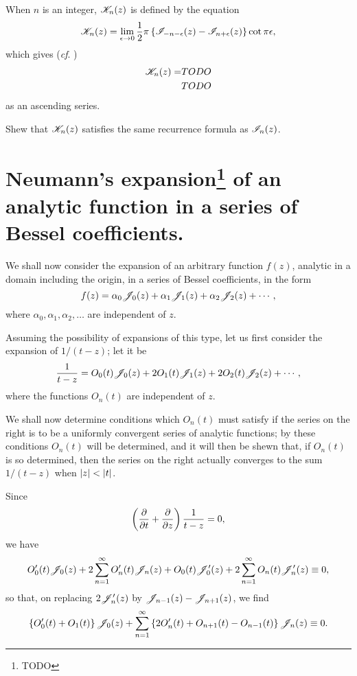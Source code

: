 \documentclass{book}
\begin{document}
When $n$ is an integer, $\mathscr{K}_n(z)$ is defined by the equation
$$
\mathscr{K}_n(z)
=
\lim_{\epsilon\rightarrow 0}
\frac{1}{2} \pi
\left\{  \mathscr{I}_{-n-\epsilon}(z) - \mathscr{I}_{n+\epsilon}(z) \right\} \cot \pi\epsilon,
$$
which gives (\emph{cf}. )
\begin{align*}
  \mathscr{K}_n(z)
  =&
  TODO
  \\
  &
  TODO
\end{align*}
as an ascending series.
\begin{wandwexample}
  Shew that $\mathscr{K}_n(z)$ satisfies the same recurrence formula as
  $\mathscr{I}_n(z)$. 
\end{wandwexample}

\section[Neumann's expansion of an analytic
function in a series of Bessel coefficients.]{Neumann's
  expansion\footnote{TODO} of an analytic function in a series
  of Bessel coefficients.}
We shall now consider the expansion of an arbitrary function
$f(z)$, analytic in a domain including the origin, in a series
of Bessel coefficients, in the form
$$
f(z) = \alpha_0 \mathscr{J}_0(z) + \alpha_1 \mathscr{J}_1(z) + \alpha_2
\mathscr{J}_2(z) + \cdots,
$$
where $\alpha_0, \alpha_1, \alpha_2,\ldots$ are independent of
$z$.

Assuming the possibility of expansions of this type, let us first
consider the expansion of $1/(t-z)$; let it be
$$
\frac{1}{t-z}
=
O_0(t) \mathscr{J}_0(z)
+ 2 O_1(t) \mathscr{J}_1(z)
+ 2 O_2(t) \mathscr{J}_2(z)
+ \cdots,
$$
where the functions $O_n(t)$ are independent of $z$.

We shall now determine conditions which $O_n(t)$ must satisfy if the
series on the right is to be a uniformly convergent series of analytic
functions; by these conditions $O_n(t)$ will be determined, and it
will then be shewn that, if $O_n(t)$ is so determined, then the series
on the right actually converges to the sum $1/(t-z)$ when
$\left| z \right| < \left| t \right|$.

Since
$$
\left( 
  \frac{\partial}{\partial t}
  +
  \frac{\partial}{\partial z}  
 \right)
\frac{1}{t-z}
=
0,
$$
we have
$$
O'_0(t) \mathscr{J}_0(z)
+
2 \sum_{n=1}^{\infty}
O'_n(t) \mathscr{J}_n(z)
+
O_0(t) \mathscr{J}'_0(z)
+
2 \sum_{n=1}^{\infty}
O_n(t) \mathscr{J}'_n(z)
\equiv
0,
$$
so that, on replacing $2\mathscr{J}'_n(z)$ by
$\mathscr{J}_{n-1}(z) - \mathscr{J}_{n+1}(z)$, we find
$$
\left\{  O'_0(t) + O_1(t)  \right\} \mathscr{J}_0(z)
+
\sum_{n=1}^{\infty}
\left\{  2 O'_n(t) + O_{n+1}(t) - O_{n-1}(t)   \right\}
\mathscr{J}_n(z)
\equiv
0.
$$
\end{document}
